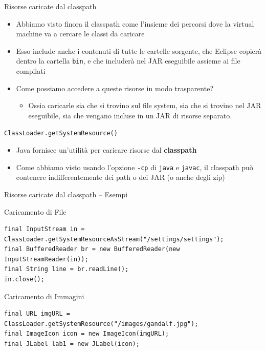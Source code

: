 \documentclass[presentation]{beamer}
\begin{document}
\begin{frame}{Risorse caricate dal classpath}
	\begin{itemize}
		\item Abbiamo visto finora il classpath come l'insieme dei percorsi dove la virtual machine va a cercare le classi da caricare
		\item Esso include anche i contenuti di tutte le cartelle sorgente, che Eclipse copierà dentro la cartella \texttt{bin}, e che includerà nel JAR eseguibile assieme ai file compilati
		\item Come possiamo accedere a queste risorse in modo trasparente?
		\begin{itemize}
			\item Ossia caricarle sia che si trovino sul file system, sia che si trovino nel JAR eseguibile, sia che vengano incluse in un JAR di risorse separato.
		\end{itemize} 
	\end{itemize}
	\begin{block}{\texttt{ClassLoader.getSystemResource()}}
		\begin{itemize}
			\item Java fornisce un'utilità per caricare risorse dal \textbf{classpath}
			\item Come abbiamo visto usando l'opzione \texttt{-cp} di \texttt{java} e \texttt{javac}, il classpath può contenere indifferentemente dei path o dei JAR (o anche degli zip)
		\end{itemize}
		\end{block}
\end{frame}

\begin{frame}[fragile]{Risorse caricate dal classpath -- Esempi}

\begin{block}{Caricamento di File}
\begin{lstlisting}
final InputStream in = ClassLoader.getSystemResourceAsStream("/settings/settings");
final BufferedReader br = new BufferedReader(new InputStreamReader(in));
final String line = br.readLine();
in.close();
\end{lstlisting}
\end{block}

\begin{block}{Caricamento di Immagini}
\begin{lstlisting}
final URL imgURL = ClassLoader.getSystemResource("/images/gandalf.jpg");
final ImageIcon icon = new ImageIcon(imgURL);
final JLabel lab1 = new JLabel(icon);
\end{lstlisting}
\end{block}
\end{frame}
\end{document}
